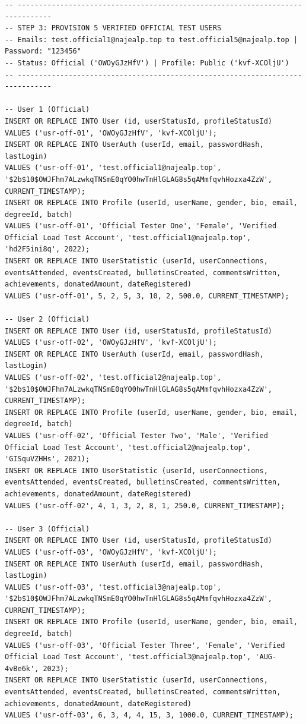 \documentclass[11pt,letterpaper]{article}
\begin{document}
\begin{lstlisting}
-- ------------------------------------------------------------------------------
-- STEP 3: PROVISION 5 VERIFIED OFFICIAL TEST USERS
-- Emails: test.official1@najealp.top to test.official5@najealp.top | Password: "123456"
-- Status: Official ('OWOyGJzHfV') | Profile: Public ('kvf-XCOljU')
-- ------------------------------------------------------------------------------

-- User 1 (Official)
INSERT OR REPLACE INTO User (id, userStatusId, profileStatusId)
VALUES ('usr-off-01', 'OWOyGJzHfV', 'kvf-XCOljU');
INSERT OR REPLACE INTO UserAuth (userId, email, passwordHash, lastLogin)
VALUES ('usr-off-01', 'test.official1@najealp.top', '$2b$10$OWJFhm7ALzwkqTNSmE0qYO0hwTnHlGLAG8s5qAMmfqvhHozxa4ZzW', CURRENT_TIMESTAMP);
INSERT OR REPLACE INTO Profile (userId, userName, gender, bio, email, degreeId, batch)
VALUES ('usr-off-01', 'Official Tester One', 'Female', 'Verified Official Load Test Account', 'test.official1@najealp.top', 'hd2F5ini8q', 2022);
INSERT OR REPLACE INTO UserStatistic (userId, userConnections, eventsAttended, eventsCreated, bulletinsCreated, commentsWritten, achievements, donatedAmount, dateRegistered)
VALUES ('usr-off-01', 5, 2, 5, 3, 10, 2, 500.0, CURRENT_TIMESTAMP);

-- User 2 (Official)
INSERT OR REPLACE INTO User (id, userStatusId, profileStatusId)
VALUES ('usr-off-02', 'OWOyGJzHfV', 'kvf-XCOljU');
INSERT OR REPLACE INTO UserAuth (userId, email, passwordHash, lastLogin)
VALUES ('usr-off-02', 'test.official2@najealp.top', '$2b$10$OWJFhm7ALzwkqTNSmE0qYO0hwTnHlGLAG8s5qAMmfqvhHozxa4ZzW', CURRENT_TIMESTAMP);
INSERT OR REPLACE INTO Profile (userId, userName, gender, bio, email, degreeId, batch)
VALUES ('usr-off-02', 'Official Tester Two', 'Male', 'Verified Official Load Test Account', 'test.official2@najealp.top', 'GISquVZHHs', 2021);
INSERT OR REPLACE INTO UserStatistic (userId, userConnections, eventsAttended, eventsCreated, bulletinsCreated, commentsWritten, achievements, donatedAmount, dateRegistered)
VALUES ('usr-off-02', 4, 1, 3, 2, 8, 1, 250.0, CURRENT_TIMESTAMP);

-- User 3 (Official)
INSERT OR REPLACE INTO User (id, userStatusId, profileStatusId)
VALUES ('usr-off-03', 'OWOyGJzHfV', 'kvf-XCOljU');
INSERT OR REPLACE INTO UserAuth (userId, email, passwordHash, lastLogin)
VALUES ('usr-off-03', 'test.official3@najealp.top', '$2b$10$OWJFhm7ALzwkqTNSmE0qYO0hwTnHlGLAG8s5qAMmfqvhHozxa4ZzW', CURRENT_TIMESTAMP);
INSERT OR REPLACE INTO Profile (userId, userName, gender, bio, email, degreeId, batch)
VALUES ('usr-off-03', 'Official Tester Three', 'Female', 'Verified Official Load Test Account', 'test.official3@najealp.top', 'AUG-4vBe6k', 2023);
INSERT OR REPLACE INTO UserStatistic (userId, userConnections, eventsAttended, eventsCreated, bulletinsCreated, commentsWritten, achievements, donatedAmount, dateRegistered)
VALUES ('usr-off-03', 6, 3, 4, 4, 15, 3, 1000.0, CURRENT_TIMESTAMP);


\end{lstlisting}
\end{document}
